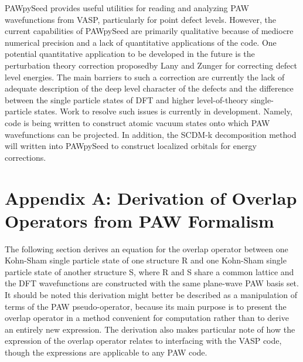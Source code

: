 \documentclass[12pt]{article}
\begin{document}
PAWpySeed provides useful utilities for reading and analyzing PAW wavefunctions
from VASP, particularly for point defect levels. However, the current capabilities
of PAWpySeed are primarily qualitative because of mediocre numerical precision
and a lack of quantitative applications of the code. One potential quantitative
application to be developed in the future is the perturbation theory correction
proposedby Lany and Zunger for correcting defect level energies.\cite{lany}
The main barriers to such a correction are currently the lack of adequate
description of the deep level character of the defects and the difference
between the single particle states of DFT and higher level-of-theory
single-particle states. Work to resolve such issues is currently in development.
Namely, code is being written to construct atomic vacuum states onto which
PAW wavefunctions can be projected. In addition, the SCDM-k decomposition method
will written into PAWpySeed to construct localized orbitals for energy
corrections.\cite{scdm,scdmk}

\section*{Appendix A: Derivation of Overlap Operators from PAW Formalism}

The following section derives an equation for the overlap operator between one
Kohn-Sham single particle state of one structure R and one Kohn-Sham single
particle state of another structure S, where R and S share a common lattice
and the DFT wavefunctions are constructed with the same plane-wave PAW basis set.
It should be noted this derivation might better be described as a manipulation
of terms of the PAW pseudo-operator, because its main purpose is to present
the overlap operator in a method convenient for computation rather than to derive
an entirely new expression. The derivation also makes particular note of how
the expression of the overlap operator relates to interfacing with the VASP code,
though the expressions are applicable to any PAW code.
\end{document}
